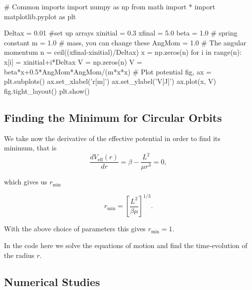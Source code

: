 \documentclass[%
oneside,                 %
final,                   %
10pt]{article}
\begin{document}
\bpycod
# Common imports
import numpy as np
from math import *
import matplotlib.pyplot as plt

Deltax = 0.01
#set up arrays
xinitial = 0.3
xfinal = 5.0
beta = 1.0   # spring constant
m = 1.0   # mass, you can change these
AngMom = 1.0  #  The angular momentum
n = ceil((xfinal-xinitial)/Deltax)
x = np.zeros(n)
for i in range(n):
    x[i] = xinitial+i*Deltax
V = np.zeros(n)
V = beta*x+0.5*AngMom*AngMom/(m*x*x)
# Plot potential
fig, ax = plt.subplots()
ax.set_xlabel('r[m]')
ax.set_ylabel('V[J]')
ax.plot(x, V)
fig.tight_layout()
plt.show()


\epycod


\subsection{Finding the Minimum for Circular Orbits}

We take now the derivative of the effective potential in order to find its minimum, that is
\[
\frac{dV_{\mathrm{eff}}(r)}{dr} = \beta-\frac{L^2}{\mu r^3}=0,
\]

which gives us $r_{\mathrm{min}}$

\[
r_{\mathrm{min}}=\left [\frac{L^2}{\beta \mu}\right ]^{1/3}.
\]

With the above choice of parameters this gives $r_{\mathrm{min}}=1$. 

In the code here we solve the equations of motion and find the time-evolution of the radius $r$.

\subsection{Numerical Studies}
\end{document}
